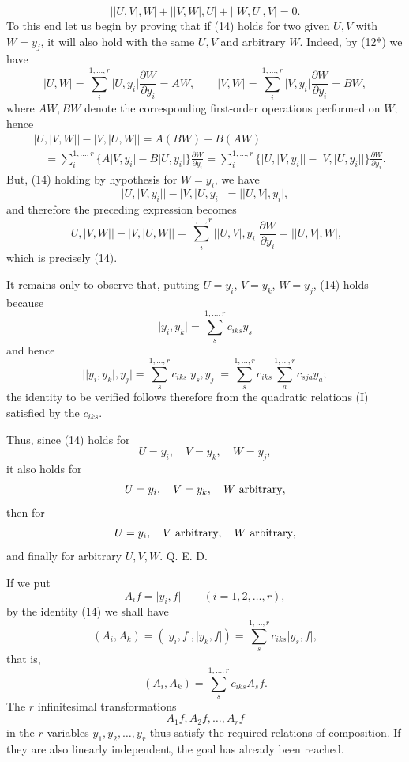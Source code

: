 \documentclass[11pt]{book}
\begin{document}
\begin{equation*}\tag{14}
 \lvert\lvert U,V\rvert,W\rvert+
 \lvert\lvert V,W\rvert,U\rvert+
 \lvert\lvert W,U\rvert,V\rvert=0.
\end{equation*}
To this end let us begin by proving that if (14) holds for two given $U,V$ with $W=y_j$, it will also hold with the same $U,V$ and arbitrary $W$. Indeed, by (12*) we have
\[
 \lvert U,W\rvert=\sum\limits_i^{1,\ldots,r}\lvert U,y_i\rvert\frac{\partial W}{\partial y_i}=AW,
 \qquad
 \lvert V,W\rvert=\sum\limits_i^{1,\ldots,r}\lvert V,y_i\rvert\frac{\partial W}{\partial y_i}=BW,
\]
where $AW,BW$ denote the corresponding first-order operations performed on $W$; hence
\[
\begin{split}
&\lvert U,\lvert V,W\rvert\rvert-
 \lvert V,\lvert U,W\rvert\rvert
 =A(BW)-B(AW)                                                    \\
&\quad=\sum\limits_i^{1,\ldots,r}\{A\lvert V,y_i\rvert-B\lvert U,y_i\rvert\}\frac{\partial W}{\partial y_i}
 =\sum\limits_i^{1,\ldots,r}\{\lvert U,\lvert V,y_i\rvert\rvert-
                 \lvert V,\lvert U,y_i\rvert\rvert\}
       \frac{\partial W}{\partial y_i}.
\end{split}
\]
But, (14) holding by hypothesis for $W=y_i$, we have
\[
 \lvert U,\lvert V,y_i\rvert\rvert-
 \lvert V,\lvert U,y_i\rvert\rvert=
 \lvert\lvert U,V\rvert,y_i\rvert,
\]
and therefore the preceding expression becomes
\[
 \lvert U,\lvert V,W\rvert\rvert-
 \lvert V,\lvert U,W\rvert\rvert
 =\sum\limits_i^{1,\ldots,r}\lvert\lvert U,V\rvert,y_i\rvert\frac{\partial W}{\partial y_i}
 =\lvert\lvert U,V\rvert,W\rvert,
\]
which is precisely (14).

It remains only to observe that, putting $U=y_i$, $V=y_k$, $W=y_j$, (14) holds because
\[
 \lvert y_i,y_k\rvert=\sum\limits_s^{1,\ldots,r}c_{iks}y_s
\]
and hence
\[
 \lvert\lvert y_i,y_k\rvert,y_j\rvert
 =\sum\limits_s^{1,\ldots,r} c_{iks}\lvert y_s,y_j\rvert
 =\sum\limits_s^{1,\ldots,r} c_{iks}\sum\limits_a^{1,\ldots,r} c_{sja}y_a;
\]
the identity to be verified follows therefore from the quadratic relations (I) satisfied by the $c_{iks}$.

Thus, since (14) holds for
\[
 U=y_i,
 \quad V=y_k,
 \quad W=y_j,
\]
it also holds for
\[
 U=y_i,
 \quad V=y_k,
 \quad W\hbox{ arbitrary},
\]
then for
\[
 U=y_i,
 \quad V\hbox{ arbitrary},
 \quad W\hbox{ arbitrary},
\]
and finally for arbitrary $U,V,W$. Q. E. D.

If we put
\[
 A_if=\lvert y_i,f\rvert\qquad(i=1,2,\ldots,r),
\]
by the identity (14) we shall have
\[
 (A_i,A_k)=(\lvert y_i,f\rvert,\lvert y_k,f\rvert)=
 \sum\limits_s^{1,\ldots,r} c_{iks}\lvert y_s,f\rvert,
\]
that is,
\[
 (A_i,A_k)=\sum\limits_s^{1,\ldots,r} c_{iks}A_s f.
\]
The $r$ infinitesimal transformations
\[
 A_1f,A_2f,\ldots,A_rf
\]
in the $r$ variables $y_1,y_2,\ldots,y_r$ thus satisfy the required relations of composition. If they are also linearly independent, the goal has already been reached.
\end{document}
